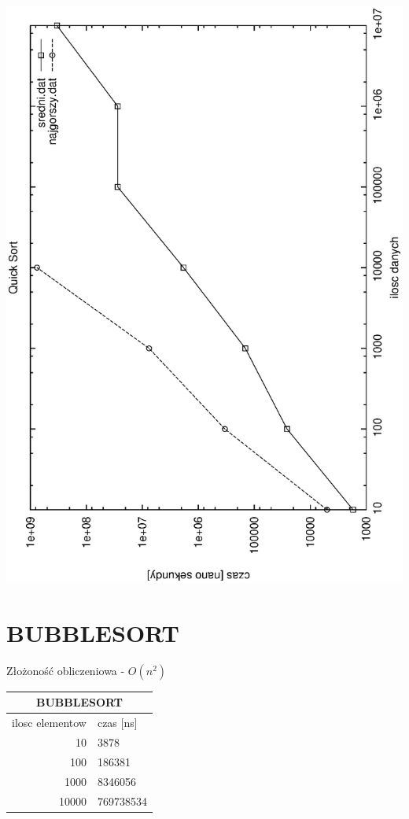 \documentclass[a4paper,11pt]{report}
\begin{document}
\includegraphics[angle=270, scale = 0.5]{wykresy/quicksort.eps}
\newpage
\section{BUBBLESORT}

Złożoność obliczeniowa - $O(n^{2})$
  
\begin{tabular}{|rl|}
\hline
\multicolumn{2}{|c|}{BUBBLESORT}\\
\hline
ilosc elementow & czas [ns]\\
\hline
10&3878\\
100&186381\\
1000&8346056\\
10000&769738534\\
\hline
\end{tabular}
\end{document}
